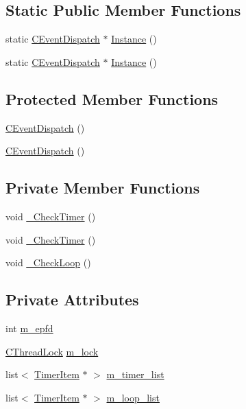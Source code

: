 \subsection*{Static Public Member Functions}
\begin{DoxyCompactItemize}
\item 
static \hyperlink{class_c_event_dispatch}{C\+Event\+Dispatch} $\ast$ \hyperlink{class_c_event_dispatch_a490d4992c0a735f00ff38e7466387f1f}{Instance} ()
\item 
static \hyperlink{class_c_event_dispatch}{C\+Event\+Dispatch} $\ast$ \hyperlink{class_c_event_dispatch_a0e2230cbe28a955671bdb1eac4923a10}{Instance} ()
\end{DoxyCompactItemize}
\subsection*{Protected Member Functions}
\begin{DoxyCompactItemize}
\item 
\hyperlink{class_c_event_dispatch_a35d4f8ba651e5d11e1b4eb327dc520f6}{C\+Event\+Dispatch} ()
\item 
\hyperlink{class_c_event_dispatch_a35d4f8ba651e5d11e1b4eb327dc520f6}{C\+Event\+Dispatch} ()
\end{DoxyCompactItemize}
\subsection*{Private Member Functions}
\begin{DoxyCompactItemize}
\item 
void \hyperlink{class_c_event_dispatch_aa964904c8edeb3fae834191f917098c1}{\+\_\+\+Check\+Timer} ()
\item 
void \hyperlink{class_c_event_dispatch_aa964904c8edeb3fae834191f917098c1}{\+\_\+\+Check\+Timer} ()
\item 
void \hyperlink{class_c_event_dispatch_aa50c5baa2e67593570872c8e27cf70cc}{\+\_\+\+Check\+Loop} ()
\end{DoxyCompactItemize}
\subsection*{Private Attributes}
\begin{DoxyCompactItemize}
\item 
int \hyperlink{class_c_event_dispatch_a7b96d723622618132822efb47ad40ee3}{m\+\_\+epfd}
\item 
\hyperlink{class_c_thread_lock}{C\+Thread\+Lock} \hyperlink{class_c_event_dispatch_a730961da480e702351187352fabfa902}{m\+\_\+lock}
\item 
list$<$ \hyperlink{struct_c_event_dispatch_1_1_timer_item}{Timer\+Item} $\ast$ $>$ \hyperlink{class_c_event_dispatch_aaff9bf41f63d04ee7b942f86c41ab8c6}{m\+\_\+timer\+\_\+list}
\item 
list$<$ \hyperlink{struct_c_event_dispatch_1_1_timer_item}{Timer\+Item} $\ast$ $>$ \hyperlink{class_c_event_dispatch_aebc1eb1b5a2dff3d5b1cf06fa3196aec}{m\+\_\+loop\+\_\+list}
\end{DoxyCompactItemize}
